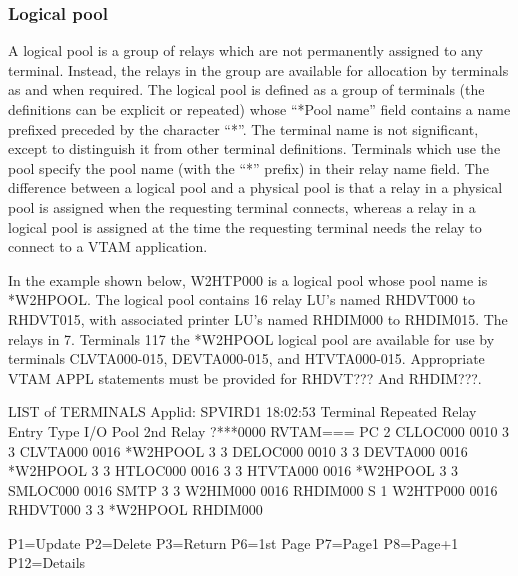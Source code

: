 \documentclass[letterpaper,10pt,english]{sphinxmanual}
\begin{document}
\subsubsection{Logical pool}
\label{\detokenize{connectivity_guide:logical-pool}}\label{\detokenize{connectivity_guide:v461cn-logicalpool}}
A logical pool is a group of relays which are not permanently assigned to any terminal. Instead, the relays in the group are available for allocation by terminals as and when required. The logical pool is defined as a group of terminals (the definitions can be explicit or repeated) whose “*Pool name” field contains a name prefixed preceded by the character “*”. The terminal name is not significant, except to distinguish it from other terminal definitions. Terminals which use the pool specify the pool name (with the “*” prefix) in their relay name field. The difference between a logical pool and a physical pool is that a relay in a physical pool is assigned when the requesting terminal connects, whereas a relay in a logical pool is assigned at the time the requesting terminal needs the relay to connect to a VTAM application.

In the example shown below, W2HTP000 is a logical pool whose pool name is *W2HPOOL. The logical pool contains 16 relay LU’s named RHDVT000 to RHDVT015, with associated printer LU’s named RHDIM000 to RHDIM015. The relays in 7. Terminals 117 the *W2HPOOL logical pool are available for use by terminals CLVTA000-015, DEVTA000-015, and HTVTA000-015. Appropriate VTAM APPL statements must be provided for RHDVT??? And RHDIM???.

\begin{sphinxVerbatim}[commandchars=\\\{\}]
LIST of TERMINALS \PYGZhy{}\PYGZhy{}\PYGZhy{}\PYGZhy{}\PYGZhy{}\PYGZhy{}\PYGZhy{}\PYGZhy{}\PYGZhy{}\PYGZhy{}\PYGZhy{}\PYGZhy{}\PYGZhy{}\PYGZhy{}\PYGZhy{}\PYGZhy{}\PYGZhy{}\PYGZhy{}\PYGZhy{}\PYGZhy{}\PYGZhy{}\PYGZhy{}\PYGZhy{}\PYGZhy{}\PYGZhy{}\PYGZhy{}\PYGZhy{}\PYGZhy{}\PYGZhy{}\PYGZhy{}\PYGZhy{}\PYGZhy{}\PYGZhy{}\PYGZhy{} Applid: SPVIRD1 18:02:53
Terminal Repeated    Relay       Entry    Type I/O  Pool      2nd Relay
?***0000             RVTAM===    PC       2
CLLOC000 0010                             3    3
CLVTA000 0016        *W2HPOOL             3    3
DELOC000 0010                             3    3
DEVTA000 0016        *W2HPOOL             3    3
HTLOC000 0016                             3    3
HTVTA000 0016        *W2HPOOL             3    3
SMLOC000 0016                    SMTP     3    3
W2HIM000 0016        RHDIM000             S    1
W2HTP000 0016        RHDVT000             3    3    *W2HPOOL   RHDIM000



P1=Update            P2=Delete            P3=Return             P6=1st Page
P7=Page\PYGZhy{}1            P8=Page+1            P12=Details
\end{sphinxVerbatim}
\end{document}
